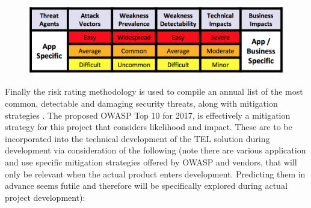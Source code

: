 \begin{figure}[H]
	\centering
	\includegraphics[scale=0.85]{figures/tabulation}
	\label{fig:OWASP Risk Rating Methodology}
\end{figure}

Finally the risk rating methodology is used to compile an annual list of the most common, detectable and damaging security threats, along with mitigation strategies \cite{OWASP2017}. The proposed OWASP Top 10 for 2017, is effectively a mitigation strategy for this project that considers likelihood and impact. These are to be incorporated into the technical development of the TEL solution during development via consideration of the following (note there are various application and use specific mitigation strategies offered by OWASP and vendors, that will only be relevant when the actual product enters development. Predicting them in advance seems futile and therefore will be specifically explored during actual project development):

